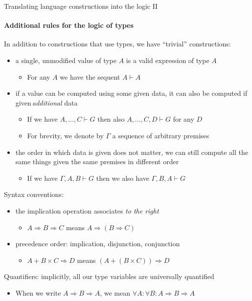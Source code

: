 \documentclass[english]{beamer}
\begin{document}
\begin{frame}{Translating language constructions into the logic II}


\framesubtitle{Additional rules for the logic of types}

In addition to constructions that use types, we have ``trivial''
constructions:
\begin{itemize}
\item a single, unmodified value of type $A$ is a valid expression of type
$A$
\begin{itemize}
\item For any $A$ we have the sequent $A\vdash A$
\end{itemize}
\item if a value can be computed using some given data, it can also be computed
if given\,\emph{additional} data
\begin{itemize}
\item If we have $A,...,C\vdash G$ then also $A,...,C,D\vdash G$ for any
$D$
\item For brevity, we denote by $\Gamma$ a sequence of arbitrary premises
\end{itemize}
\item the order in which data is given does not matter, we can still compute
all the same things given the same premises in different order
\begin{itemize}
\item If we have $\Gamma,A,B\vdash G$ then we also have $\Gamma,B,A\vdash G$
\end{itemize}
\end{itemize}
Syntax conventions:
\begin{itemize}
\item the implication operation associates \emph{to the right}
\begin{itemize}
\item $A\Rightarrow B\Rightarrow C$ means $A\Rightarrow\left(B\Rightarrow C\right)$
\end{itemize}
\item precedence order: implication, disjunction, conjunction
\begin{itemize}
\item $A+B\times C\Rightarrow D$ means $\left(A+\left(B\times C\right)\right)\Rightarrow D$
\end{itemize}
\end{itemize}
Quantifiers: implicitly, all our type variables are universally quantified
\begin{itemize}
\item When we write $A\Rightarrow B\Rightarrow A$, we mean $\forall A:\forall B:A\Rightarrow B\Rightarrow A$
\end{itemize}
\end{frame}
\end{document}
